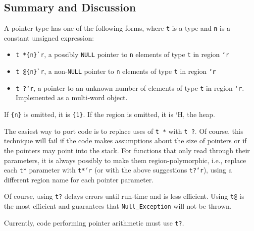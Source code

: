 \subsection*{\hypertarget{pointer_summary}{Summary and Discussion}}
A pointer type has one of the following forms, where \texttt{t} is a
type and \texttt{n} is a constant unsigned expression:

\begin{itemize}
\item \verb|t *{n}`r|, a possibly \texttt{NULL} pointer to \texttt{n}
  elements of type \texttt{t} in region \texttt{`r}
\item \verb|t @{n}`r|, a non-\texttt{NULL} pointer to \texttt{n} elements
  of type \texttt{t} in region \texttt{`r}
\item \texttt{t ?`r}, a pointer to an unknown number of elements of type
  \texttt{t} in region \texttt{`r}.  Implemented as a multi-word object.
\end{itemize}
If \verb|{n}| is omitted, it is \verb|{1}|.  If the region is omitted,
it is `H, the heap.

The easiest way to port code is to replace uses of \texttt{t *} with
\texttt{t ?}.  Of course, this technique will fail if the code makes
assumptions about the size of pointers or if the pointers may point
into the stack.  For functions that only read through their
parameters, it is always possibly to make them region-polymorphic,
i.e., replace each \texttt{t*} parameter with \texttt{t*`r} (or with the
above suggestions \texttt{t?`r}), using a different region name for each
pointer parameter.

Of course, using \texttt{t?} delays errors until run-time and is less
efficient.  Using \texttt{t@} is the most efficient and
guarantees that \texttt{Null_Exception} will not be thrown.

Currently, code performing pointer arithmetic must use \texttt{t?}.

